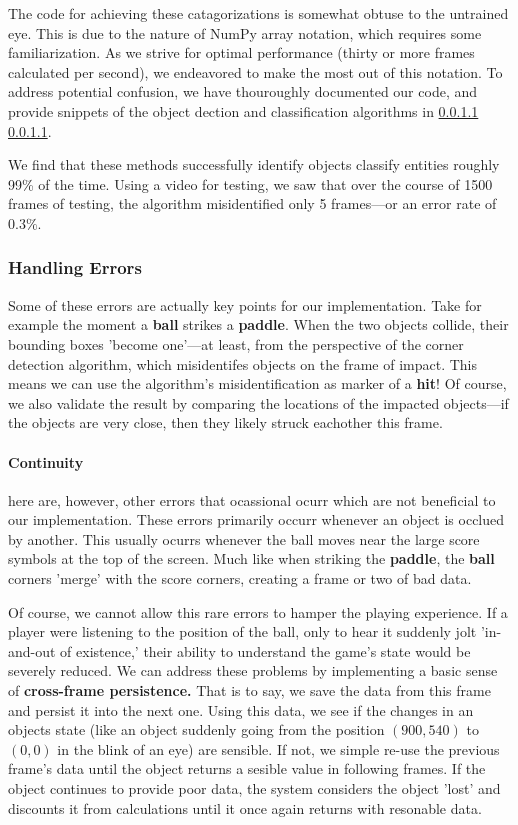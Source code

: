 \documentclass{report}
\newcommand{\state}[1]{\textbf{#1}}
\newcommand{\pad}{\textbf{paddle}\xspace}
\newcommand{\ball}{\textbf{ball}\xspace}
\newcommand{\tech}[1]{\textbf{#1}}
\begin{document}
The code for achieving these catagorizations is somewhat obtuse to the untrained eye. This is due to the nature of NumPy array notation, which requires some familiarization. As we strive for optimal performance (thirty or more frames calculated per second), we endeavored to make the most out of this notation. To address potential confusion, we have thouroughly documented our code, and provide snippets of the object dection and classification algorithms in \ref{} \ref{}.

We find that these methods successfully identify objects classify entities roughly 99\% of the time. Using a video for testing, we saw that over the course of 1500 frames of testing, the algorithm misidentified only 5 frames---or an error rate of $0.3\%$. 

\subsubsection{Handling Errors}

Some of these errors are actually key points for our implementation. Take for example the moment a \ball strikes a \pad. When the two objects collide, their bounding boxes 'become one'---at least, from the perspective of the corner detection algorithm, which misidentifes objects on the frame of impact. This means we can use the algorithm's misidentification as marker of a \state{hit}! Of course, we also validate the result by comparing the locations of the impacted objects---if the objects are very close, then they likely struck eachother this frame.

\paragraph{Continuity}

here are, however, other errors that ocassional ocurr which are not beneficial to our implementation. These errors primarily occurr whenever an object is occlued by another. This usually ocurrs whenever the ball moves near the large score symbols at the top of the screen. Much like when striking the \pad, the \ball corners 'merge' with the score corners, creating a frame or two of bad data. 

Of course, we cannot allow this rare errors to hamper the playing experience. If a player were listening to the position of the ball, only to hear it suddenly jolt 'in-and-out of existence,' their ability to understand the game's state would be severely reduced. We can address these problems by implementing a basic sense of \tech{cross-frame persistence.} That is to say, we save the data from this frame and persist it into the next one. Using this data, we see if the changes in an objects state (like an object suddenly going from the position $(900, 540)$ to $(0, 0)$ in the blink of an eye) are sensible. If not, we simple re-use the previous frame's data until the object returns a sesible value in following frames. If the object continues to provide poor data, the system considers the object 'lost' and discounts it from calculations until it once again returns with resonable data. 
\end{document}
